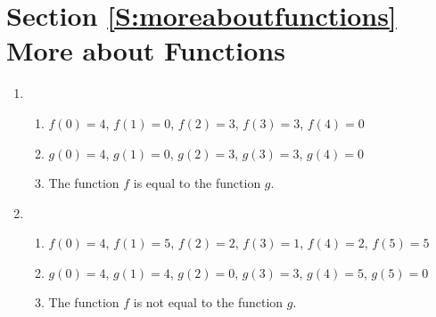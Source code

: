 \section*{Section \ref{S:moreaboutfunctions} More about Functions}

\begin{enumerate}
\item \begin{enumerate}
\item $f(0) = 4$, $f(1) = 0$, $f(2) = 3$, $f(3) = 3$, $f(4) = 0$

\item $g(0) = 4$, $g(1) = 0$, $g(2) = 3$, $g(3) = 3$, $g(4) = 0$

\item The function $f$ is equal to the function $g$.
\end{enumerate}



\item \begin{enumerate}
\item $f(0) = 4$, $f(1) = 5$, $f(2) = 2$, $f(3) = 1$, $f(4) = 2$, $f(5) = 5$

\item $g(0) = 4$, $g(1) = 4$, $g(2) = 0$, $g(3) = 3$, $g(4) = 5$, $g(5)= 0$

\item The function $f$ is not equal to the function $g$.
\end{enumerate}



%
%
%
%
%



\end{enumerate}
